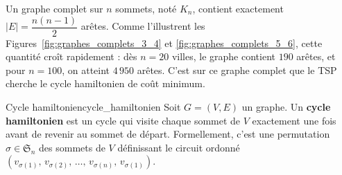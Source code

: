 \documentclass[12pt, a4paper, twoside, openright]{book}
\begin{document}
	
	
	Un graphe complet sur $n$ sommets, noté $K_n$, contient exactement
	$|E| = \dfrac{n(n-1)}{2}$ arêtes. Comme l'illustrent les
	Figures~\ref{fig:graphes_complets_3_4} et \ref{fig:graphes_complets_5_6}, cette quantité croît rapidement :
	dès $n = 20$ villes, le graphe contient $190$ arêtes, et pour $n = 100$,
	on atteint $4\,950$ arêtes. C'est sur ce graphe complet que le TSP
	cherche le cycle hamiltonien de coût minimum.
	
	\begin{definition}{Cycle hamiltonien}{cycle_hamiltonien}
		Soit $G = (V, E)$ un graphe. Un \textbf{cycle hamiltonien} est un cycle
		qui visite chaque sommet de $V$ exactement une fois avant de revenir au
		sommet de départ. Formellement, c'est une permutation
		$\sigma \in \mathfrak{S}_n$ des sommets de $V$ définissant le circuit
		ordonné $(v_{\sigma(1)},\, v_{\sigma(2)},\, \ldots,\, v_{\sigma(n)},\,
		v_{\sigma(1)})$.
	\end{definition}
\end{document}
